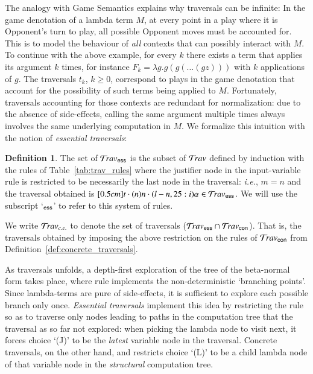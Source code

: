 \documentclass{elsarticle}
\makeatletter
\theoremstyle{plain}
\theoremstyle{definition}
\newtheorem{definition}{Definition}[section]
\theoremstyle{remark}
\newcommand\Nodes{\mathcal{N}}%
\newcommand\NodesVar{\Nodes_{\sf var}}%
\newcommand{\essential}{{\sf ess}}
\newcommand{\concrete}{{\sf con}}
\newcommand{\travsetes}{{\travset_\essential}}
\newcommand{\travsetcon}{{\travset_\concrete}}
\newcommand{\travsetcones}{{\travset_{c.e.}}} %
\newcommand{\travulc}{\travset}
\newcommand{\rulefont}[1]{\mathbf{\sf #1}}
\newcommand{\enables}{\vdash} %
\newcommand{\ExternalNodes}{\Nodes^{\sf ext}}
\renewcommand\ie{{\it i.e.\@\xspace}}
\makeatother
\begin{document}
The analogy with Game Semantics explains why traversals can be infinite: In the game denotation of a lambda term $M$, at every point in a play where it is Opponent's turn to play, all possible Opponent moves must be accounted for.
This is to model the behaviour of \emph{all} contexts that can possibly interact with $M$. To continue with the above example, for every $k$ there exists a term that applies its argument $k$ times, for instance $F_k = \lambda g . g (g ( \ldots (g z)))$ with $k$ applications of $g$.
The traversals $t_k$, $k\geq 0$, correspond to plays
 in the game denotation that account for the possibility of
 such terms being applied to $M$. Fortunately, traversals accounting for those contexts are redundant for normalization: due to the absence of side-effects, calling the same argument multiple times always involves the same underlying computation in $M$. We formalize this intuition with the notion of \emph{essential traversals}:

\begin{definition}
\label{dfn:essential_traversals}
The set of  $\travsetes$ is the subset of $\travulc$ defined by induction with the rules of Table~\ref{tab:trav_rules} where the justifier node in the
input-variable rule  is restricted to be necessarily the last node in the traversal: \ie, $m=n$ and the traversal obtained is $\Pstr[0.5cm]{t \cdot (n){n} \cdot (l-n,25:i){\alpha}} \in \travsetes$.
We will use the subscript `${}_\essential$' to refer to this system of rules.

We write $\travsetcones$ to denote the set of
 traversals ($\travsetes \inter \travsetcon$).
 That is, the traversals obtained by imposing the above restriction on the rules of $\travsetcon$ from Definition~\ref{def:concrete_traversals}.
\end{definition}

As traversals unfolds, a depth-first exploration of the tree of the beta-normal form takes place, where rule  implements the non-deterministic `branching points'. Since lambda-terms are pure of side-effects,
it is sufficient to explore each possible branch only once.
\emph{Essential traversals} implement this idea by restricting the rule  so as to traverse only nodes leading to paths in the computation tree that the traversal as so far not explored: when picking the lambda node to visit next, it forces choice `(J)' to be the \emph{latest} variable node in the traversal. Concrete traversals, on the other hand, and restricts choice `(L)' to be a child lambda node of that variable node in the \emph{structural} computation tree.
\end{document}
